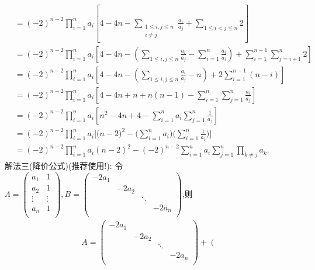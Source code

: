 \documentclass[../../main.tex]{subfiles}%
\begin{document}
\begin{solution}
\begin{enumerate}[(1)]
\begin{align*}
&=\left( -2 \right) ^{n-2}\prod_{i=1}^n{a_i}\left[ 4-4n-\sum_{\substack{
1\leqslant i,j\leqslant n\\
i\ne j\\
}}{\frac{a_i}{a_j}}+\sum_{1\leqslant i<j\leqslant n}{2} \right] 
\\
&=\left( -2 \right) ^{n-2}\prod_{i=1}^n{a_i}\left[ 4-4n-\left( \sum_{1\leqslant i,j\leqslant n}{\frac{a_i}{a_j}}-\sum_{i=1}^n{\frac{a_i}{a_i}} \right) +\sum_{i=1}^{n-1}{\sum_{j=i+1}^n{2}} \right] 
\\
&=\left( -2 \right) ^{n-2}\prod_{i=1}^n{a_i}\left[ 4-4n-\left( \sum_{1\leqslant i,j\leqslant n}{\frac{a_i}{a_j}}-n \right) +2\sum_{i=1}^{n-1}{\left( n-i \right)} \right] 
\\
&=\left( -2 \right) ^{n-2}\prod_{i=1}^n{a_i}\left[ 4-4n+n+n\left( n-1 \right) -\sum_{i=1}^n{\sum_{j=1}^n{\frac{a_i}{a_j}}} \right] 
\\
&=\left( -2 \right) ^{n-2}\prod_{i=1}^n{a_i}\left[ n^2-4n+4-\sum_{i=1}^n{a_i\sum_{j=1}^n{\frac{1}{a_j}}} \right] 
\\
&=\left( -2 \right) ^{n-2}\prod_{i=1}^n{a_i[(n}-2)^2-(\sum_{i=1}^n{a_i)(\sum_{i=1}^n{\frac{1}{a_i})]}}
\\
&=(-2)^{n-2}\prod_{i=1}^n{a_i}\left( n-2 \right) ^2-(-2)^{n-2}\sum_{i=1}^n{a_i}\sum_{j=1}^n{\prod_{k\ne j}{a_k}}.
\end{align*}
{\color{blue}解法三(降价公式)(推荐使用!):}
令$\varLambda=\left( \begin{matrix}
a_1&		1\\
a_2&		1\\
\vdots&		\vdots\\
a_n&		1\\
\end{matrix} \right) ,B=\left( \begin{matrix}
-2a_1&		&		&		\\
&		-2a_2&		&		\\
&		&		\ddots&		\\
&		&		&		-2a_n\\
\end{matrix} \right) $,则
\begin{align*}
A=\left( \begin{matrix}
-2a_1&		&		&		\\
&		-2a_2&		&		\\
&		&		\ddots&		\\
&		&		&		-2a_n\\
\end{matrix} \right) +\left( \begin{matrix}

\end{matrix}
\end{align*}
\end{enumerate}
\end{solution}
\end{document}
